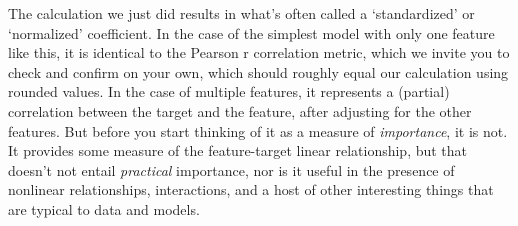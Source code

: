 \documentclass[
  letterpaper,
]{krantz}
\begin{document}
\begin{tcolorbox}[enhanced jigsaw, titlerule=0mm, colbacktitle=quarto-callout-tip-color!10!white, title=\textcolor{quarto-callout-tip-color}{\faLightbulb}\hspace{0.5em}{Standardized Coefficients}, bottomtitle=1mm, rightrule=.15mm, colframe=quarto-callout-tip-color-frame, colback=white, opacityback=0, left=2mm, arc=.35mm, toptitle=1mm, bottomrule=.15mm, leftrule=.75mm, toprule=.15mm, coltitle=black, breakable, opacitybacktitle=0.6]

The calculation we just did results in what's often called a
`standardized' or `normalized' coefficient. In the case of the simplest
model with only one feature like this, it is identical to the Pearson r
correlation metric, which we invite you to check and confirm on your
own, which should roughly equal our calculation using rounded values. In
the case of multiple features, it represents a (partial) correlation
between the target and the feature, after adjusting for the other
features. But before you start thinking of it as a measure of
\emph{importance}, it is not. It provides some measure of the
feature-target linear relationship, but that doesn't not entail
\emph{practical} importance, nor is it useful in the presence of
nonlinear relationships, interactions, and a host of other interesting
things that are typical to data and models.

\end{tcolorbox}
\end{document}
